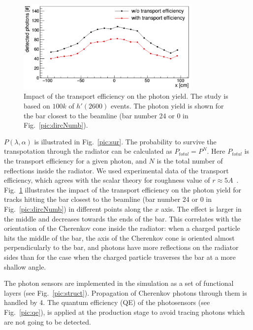 \begin{figure}[!b]
\centering
\includegraphics[width=0.8\textwidth]{pics/transport.png}
\caption{\label{pic:tra}
Impact of the transport efficiency on the photon yield. The study is based on $100k$ of $h'(2600)$ events. The photon yield is shown for the bar closest to the beamline (bar number 24 or 0 in Fig.~\ref{pic:dircNumb}).
}
\end{figure}

$P(\lambda,\alpha)$ is illustrated in Fig.~\ref{pic:sur}. The probability to survive the transpotation through the radiator can be calculated as $P_{total} = P^{N}$. Here $P_{total}$ is the transport efficiency for a given photon, and $N$ is the total number of reflections inside the radiator. We used experimental data of the transport efficiency, which agrees with the scalar theory for roughness value of $r \approx 5 A$~\cite{roughness}. Fig.~\ref{pic:tra} illustrates the impact of the transport efficiency on the photon yield for tracks hitting the bar closest to the beamline (bar number 24 or 0 in Fig.~\ref{pic:dircNumb}) in different points along the $x$ axis. The effect is larger in the middle and decreases towards the ends of the bar. This correlates with the orientation of the Cherenkov cone inside the radiator: when a charged particle hits the middle of the bar, the axis of the Cherenkov cone is oriented almost perpendicularly to the bar, and photons have more reflections on the radiator sides than for the case when the charged particle traverses the bar at a more shallow angle.

The photon sensors are implemented in the simulation as a set of functional layers (see Fig.~\ref{pic:struct}). Propagation of Cherenkov photons through them is handled by {\geant}4. The quantum efficiency (QE) of the photosensors (see Fig.~\ref{pic:qe}), is applied at the production stage to avoid tracing photons which are not going to be detected.


